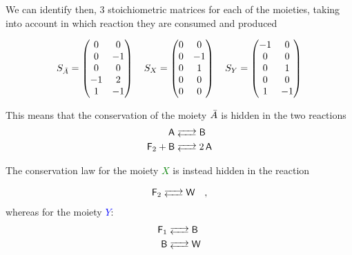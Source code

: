 \documentclass{article}
\begin{document}
We can identify then, 3 stoichiometric matrices for each of the moieties, taking into account in which reaction they are consumed and produced

\begin{center}
    \begin{equation}
        S_{\Bar{A}}=\begin{pmatrix}
            0 & 0 \\
            0 & -1 \\
            0 & 0 \\
            -1 & 2 \\
            1 & -1 \\
            
\end{pmatrix} \quad
S_{X}=\begin{pmatrix}
            0 & 0 \\
            0 & -1 \\
            0 & 1 \\
            0 & 0 \\
            0 & 0 \\
            
\end{pmatrix} \quad
S_{Y}=\begin{pmatrix}
            -1 & 0 \\
            0 & 0 \\
            0 & 1 \\
            0 & 0 \\
            1 & -1 \\
            
\end{pmatrix}
    \end{equation}
\end{center}

This means that the conservation of the moiety \textcolor{red}{$\Bar{A}$} is hidden in the two reactions 
\begin{equation}
		\begin{split}
  \ce{\textsf{A} & <--> \textsf{B} }	\\
  \ce{\textsf{F}_2 + \textsf{B} & <--> 2 \textsf{A} }
		\end{split} 
\end{equation}

The conservation law for the moiety \textcolor{green}{$X$} is instead hidden in the reaction

\begin{equation}
		\begin{split}
  \ce{\textsf{F}_2 & <--> \textsf{W} }
		\end{split}, 
\end{equation}
whereas for the moiety \textcolor{blue}{$Y$}:
\begin{equation}
		\begin{split}
  \ce{\textsf{F}_1 & <--> \textsf{B} }	\\
  \ce{\textsf{B} & <-->  \textsf{W} }
		\end{split} 
\end{equation}
\end{document}
